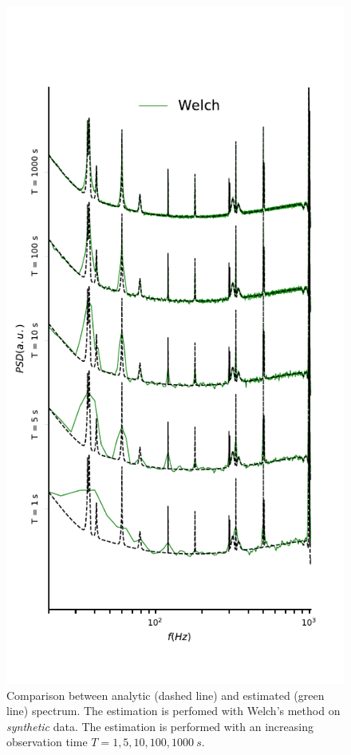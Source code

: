 \documentclass[twocolumn,showpacs,preprintnumbers,nofootinbib,prd,
superscriptaddress,10pt]{revtex4-1}
\begin{document}
\begin{figure}[!t]
	\caption{Comparison between analytic (dashed line) and estimated (green line) spectrum. The estimation is perfomed with Welch's method on \textit{synthetic} data. The estimation is performed with an increasing observation time $T = 1, 5, 10, 100, \SI{1000}{s}$.}
	\label{fig:welch_LIGO_data}
	\includegraphics{Images/comparison_LVC_data/comparison_LVC_data_Welch.pdf}
\end{figure}
\end{document}
